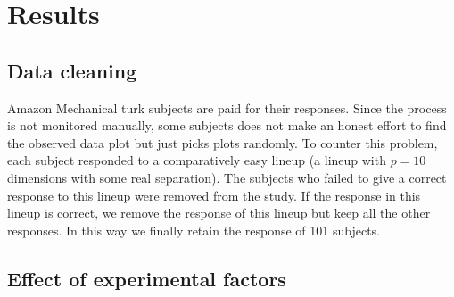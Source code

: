 \documentclass[12]{article}
\begin{document}
\section{Results}



\subsection{Data cleaning}

Amazon Mechanical turk subjects are paid for their responses. Since the process is not monitored manually, some subjects does not make an honest effort to find the observed data plot but just picks plots randomly. To counter this problem, each subject responded to a comparatively easy lineup (a lineup with $p = 10$ dimensions with some real separation). The subjects who failed to give a correct response to this lineup were removed from the study. If the response in this lineup is correct, we remove the response of this lineup but keep all the other responses. In this way we finally retain the response of 101 subjects.  

\subsection{Effect of experimental factors} \label{effects}
\end{document}
